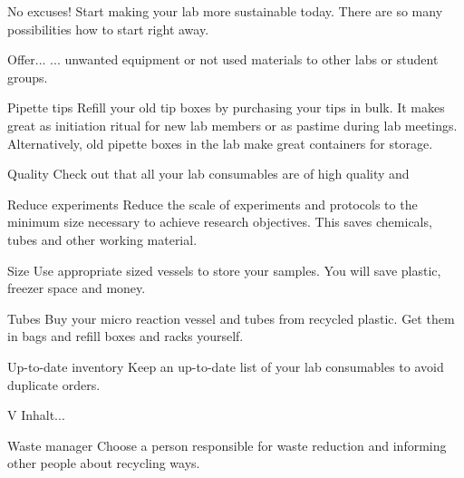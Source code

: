 \begin{suggest}{No excuses! }
	Start making your lab more sustainable today. There are so many possibilities how to start right away. 
\end{suggest}

\begin{suggest}{Offer...}
	... unwanted equipment or not used materials to other labs or student groups. 
\end{suggest}

\begin{suggest}{Pipette tips}
	Refill your old tip boxes by purchasing your tips in bulk. It makes great as initiation ritual for new lab members or as pastime during lab meetings. Alternatively, old pipette boxes in the lab make great containers for storage. 
\end{suggest}

\begin{suggest}{Quality}
	Check out that all  your lab consumables are of high quality and 
\end{suggest}

\begin{suggest}{Reduce experiments}
	Reduce the scale of experiments and protocols to the minimum size necessary to achieve research objectives. 
	This saves chemicals, tubes and other working material.
\end{suggest}

\begin{suggest}{Size}
 	Use appropriate sized vessels to store your samples. You will save plastic, freezer space and money.
\end{suggest}

\begin{suggest}{Tubes}
	Buy your micro reaction vessel and tubes from recycled plastic. Get them in bags and refill boxes and racks yourself.
\end{suggest}

\begin{suggest}{Up-to-date inventory}
	Keep an up-to-date list of your lab consumables to avoid duplicate orders.
\end{suggest}

\begin{suggest}{V}
	Inhalt...
\end{suggest}

\begin{suggest}{Waste manager}
	Choose a person responsible for waste reduction and informing other people about recycling ways. 
\end{suggest}

